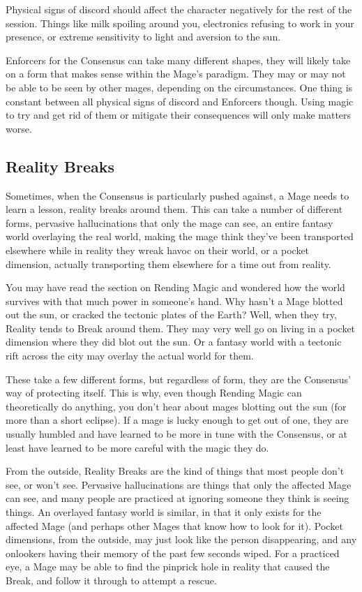 \documentclass[
]{article}
\begin{document}
Physical signs of discord should affect the character negatively for the
rest of the session. Things like milk spoiling around you, electronics
refusing to work in your presence, or extreme sensitivity to light and
aversion to the sun.

Enforcers for the Consensus can take many different shapes, they will
likely take on a form that makes sense within the Mage's paradigm. They
may or may not be able to be seen by other mages, depending on the
circumstances. One thing is constant between all physical signs of
discord and Enforcers though. Using magic to try and get rid of them or
mitigate their consequences will only make matters worse.

\hypertarget{reality-breaks-1}{%
\subsection{Reality Breaks}\label{reality-breaks-1}}

Sometimes, when the Consensus is particularly pushed against, a Mage
needs to learn a lesson, reality breaks around them. This can take a
number of different forms, pervasive hallucinations that only the mage
can see, an entire fantasy world overlaying the real world, making the
mage think they've been transported elsewhere while in reality they
wreak havoc on their world, or a pocket dimension, actually transporting
them elsewhere for a time out from reality.

You may have read the section on Rending Magic and wondered how the
world survives with that much power in someone's hand. Why hasn't a Mage
blotted out the sun, or cracked the tectonic plates of the Earth? Well,
when they try, Reality tends to Break around them. They may very well go
on living in a pocket dimension where they did blot out the sun. Or a
fantasy world with a tectonic rift across the city may overlay the
actual world for them.

These take a few different forms, but regardless of form, they are the
Consensus' way of protecting itself. This is why, even though Rending
Magic can theoretically do anything, you don't hear about mages blotting
out the sun (for more than a short eclipse). If a mage is lucky enough
to get out of one, they are usually humbled and have learned to be more
in tune with the Consensus, or at least have learned to be more careful
with the magic they do.

From the outside, Reality Breaks are the kind of things that most people
don't see, or won't see. Pervasive hallucinations are things that only
the affected Mage can see, and many people are practiced at ignoring
someone they think is seeing things. An overlayed fantasy world is
similar, in that it only exists for the affected Mage (and perhaps other
Mages that know how to look for it). Pocket dimensions, from the
outside, may just look like the person disappearing, and any onlookers
having their memory of the past few seconds wiped. For a practiced eye,
a Mage may be able to find the pinprick hole in reality that caused the
Break, and follow it through to attempt a rescue.
\end{document}
